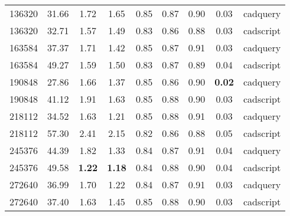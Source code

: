 \begin{table}[]
\begin{tabular}{ccccccccc}
		136320              & 31.66                 & 1.72                  & 1.65                   & 0.85                   & 0.87                   & 0.90                    & 0.03          & cadquery  \\
		136320              & 32.71                 & 1.57                  & 1.49                   & 0.83                   & 0.86                   & 0.88                    & 0.03          & cadscript \\
		163584              & 37.37                 & 1.71                  & 1.42                   & 0.85                   & 0.87                   & 0.91                    & 0.03          & cadquery  \\
		163584              & 49.27                 & 1.59                  & 1.50                   & 0.83                   & 0.87                   & 0.89                    & 0.04          & cadscript \\
		190848              & 27.86                 & 1.66                  & 1.37                   & 0.85                   & 0.86                   & 0.90                    & \textbf{0.02} & cadquery  \\
		190848              & 41.12                 & 1.91                  & 1.63                   & 0.85                   & 0.88                   & 0.90                    & 0.03          & cadscript \\
		218112              & 34.52                 & 1.63                  & 1.21                   & 0.85                   & 0.88                   & 0.91                    & 0.03          & cadquery  \\
		218112              & 57.30                 & 2.41                  & 2.15                   & 0.82                   & 0.86                   & 0.88                    & 0.05          & cadscript \\
		245376              & 44.39                 & 1.82                  & 1.33                   & 0.84                   & 0.87                   & 0.91                    & 0.04          & cadquery  \\
		245376              & 49.58                 & \textbf{1.22}         & \textbf{1.18}          & 0.84                   & 0.88                   & 0.90                    & 0.04          & cadscript \\
		272640              & 36.99                 & 1.70                  & 1.22                   & 0.84                   & 0.87                   & 0.91                    & 0.03          & cadquery  \\
		272640              & 37.40                 & 1.63                  & 1.45                   & 0.85                   & 0.88                   & 0.90                    & 0.03          & cadscript \\
		\hline
	\end{tabular}
\end{table}

